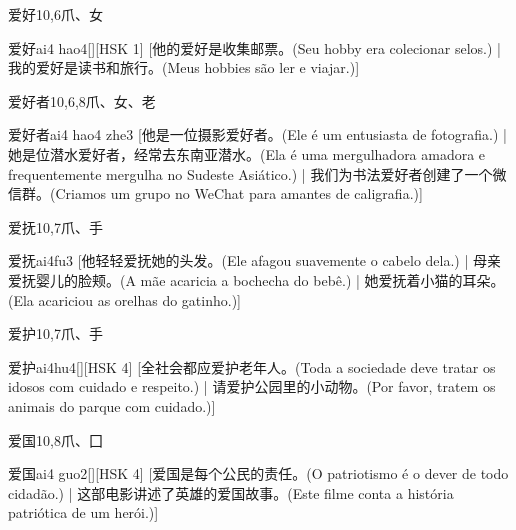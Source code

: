 \begin{entry}{爱好}{10,6}{⽖、⼥}
  \begin{phonetics}{爱好}{ai4 hao4}[][HSK 1]
    [他的爱好是收集邮票。(Seu hobby era colecionar selos.)  | 我的爱好是读书和旅行。(Meus hobbies são ler e viajar.)]
  \end{phonetics}
\end{entry}

\begin{entry}{爱好者}{10,6,8}{⽖、⼥、⽼}
  \begin{phonetics}{爱好者}{ai4 hao4 zhe3}
    [他是一位摄影爱好者。(Ele é um entusiasta de fotografia.) | 她是位潜水爱好者，经常去东南亚潜水。(Ela é uma mergulhadora amadora e frequentemente mergulha no Sudeste Asiático.)  | 我们为书法爱好者创建了一个微信群。(Criamos um grupo no WeChat para amantes de caligrafia.)]
  \end{phonetics}
\end{entry}

\begin{entry}{爱抚}{10,7}{⽖、⼿}
  \begin{phonetics}{爱抚}{ai4fu3}
    [他轻轻爱抚她的头发。(Ele afagou suavemente o cabelo dela.) | 母亲爱抚婴儿的脸颊。(A mãe acaricia a bochecha do bebê.) | 她爱抚着小猫的耳朵。(Ela acariciou as orelhas do gatinho.)]
  \end{phonetics}
\end{entry}

\begin{entry}{爱护}{10,7}{⽖、⼿}
  \begin{phonetics}{爱护}{ai4hu4}[][HSK 4]
    [全社会都应爱护老年人。(Toda a sociedade deve tratar os idosos com cuidado e respeito.) | 请爱护公园里的小动物。(Por favor, tratem os animais do parque com cuidado.)]
  \end{phonetics}
\end{entry}

\begin{entry}{爱国}{10,8}{⽖、⼞}
  \begin{phonetics}{爱国}{ai4 guo2}[][HSK 4]
    [爱国是每个公民的责任。(O patriotismo é o dever de todo cidadão.) | 这部电影讲述了英雄的爱国故事。(Este filme conta a história patriótica de um herói.)]
  \end{phonetics}
\end{entry}

